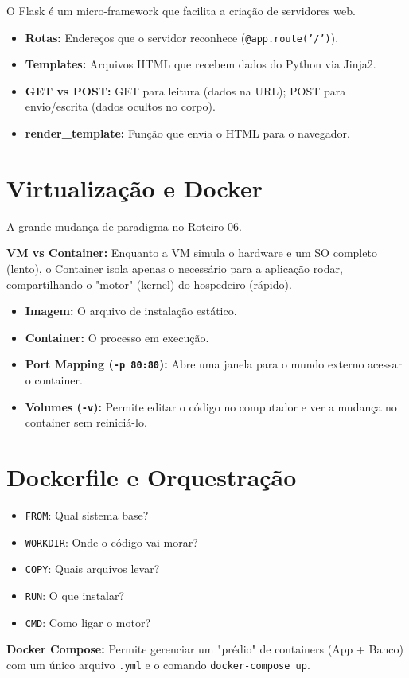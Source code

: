 \documentclass[12pt,a4paper]{article}
\begin{document}
O Flask é um micro-framework que facilita a criação de servidores web.

\begin{itemize}
    \item \textbf{Rotas:} Endereços que o servidor reconhece (\texttt{@app.route('/')}).
    \item \textbf{Templates:} Arquivos HTML que recebem dados do Python via Jinja2.
    \item \textbf{GET vs POST:} GET para leitura (dados na URL); POST para envio/escrita (dados ocultos no corpo).
    \item \textbf{render\_template:} Função que envia o HTML para o navegador.
\end{itemize}

\section{Virtualização e Docker}

A grande mudança de paradigma no Roteiro 06.

\begin{boxDestaque}
\textbf{VM vs Container:} Enquanto a VM simula o hardware e um SO completo (lento), o Container isola apenas o necessário para a aplicação rodar, compartilhando o "motor" (kernel) do hospedeiro (rápido).
\end{boxDestaque}

\begin{itemize}
    \item \textbf{Imagem:} O arquivo de instalação estático.
    \item \textbf{Container:} O processo em execução.
    \item \textbf{Port Mapping (\texttt{-p 80:80}):} Abre uma janela para o mundo externo acessar o container.
    \item \textbf{Volumes (\texttt{-v}):} Permite editar o código no computador e ver a mudança no container sem reiniciá-lo.
\end{itemize}

\section{Dockerfile e Orquestração}

\begin{boxRevisao}
\begin{itemize}
    \item \texttt{FROM}: Qual sistema base?
    \item \texttt{WORKDIR}: Onde o código vai morar?
    \item \texttt{COPY}: Quais arquivos levar?
    \item \texttt{RUN}: O que instalar?
    \item \texttt{CMD}: Como ligar o motor?
\end{itemize}
\end{boxRevisao}

\textbf{Docker Compose:} Permite gerenciar um "prédio" de containers (App + Banco) com um único arquivo \texttt{.yml} e o comando \texttt{docker-compose up}.
\end{document}
